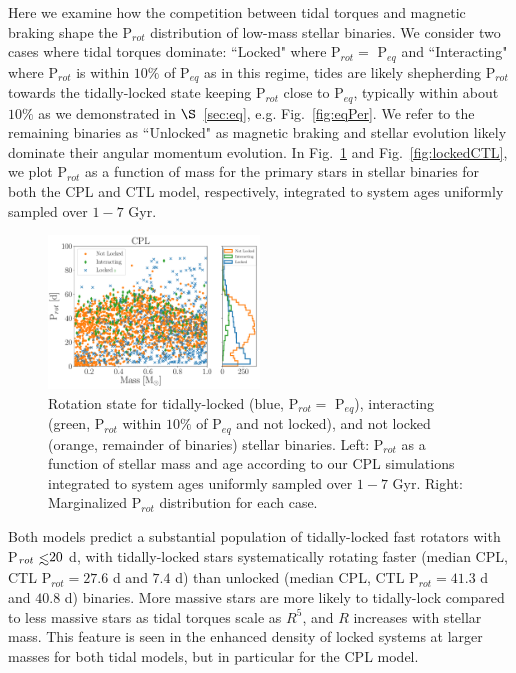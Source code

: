 \documentclass[twocolumn]{aastex61}
\def\lsim{~\rlap{$<$}{\lower 1.0ex\hbox{$\sim$}}}
\begin{document}
Here we examine how the competition between tidal torques and magnetic braking shape the P$_{rot}$ distribution of low-mass stellar binaries.  We consider two cases where tidal torques dominate: ``Locked" where P$_{rot} = $ P$_{eq}$ and ``Interacting" where P$_{rot}$ is within $10\%$ of P$_{eq}$ as in this regime, tides are likely shepherding P$_{rot}$ towards the tidally-locked state keeping P$_{rot}$ close to P$_{eq}$, typically within about $10\%$ as we demonstrated in $\S$~\ref{sec:eq}, e.g. Fig.~\ref{fig:eqPer}. We refer to the remaining binaries as ``Unlocked" as magnetic braking and stellar evolution likely dominate their angular momentum evolution.  In Fig.~\ref{fig:lockedCPL} and Fig.~\ref{fig:lockedCTL}, we plot P$_{rot}$ as a function of mass for the primary stars in stellar binaries for both the CPL and CTL model, respectively, integrated to system ages uniformly sampled over $1-7$ Gyr.  

\begin{figure}
	\includegraphics[width=0.5\textwidth]{../Plots/lockedCPL.pdf}
   \caption{Rotation state for tidally-locked (blue, P$_{rot} = $ P$_{eq}$), interacting (green, P$_{rot}$ within $10\%$ of P$_{eq}$ and not locked), and not locked (orange, remainder of binaries) stellar binaries. Left: P$_{rot}$ as a function of stellar mass and age according to our CPL simulations integrated to system ages uniformly sampled over $1-7$ Gyr. Right: Marginalized P$_{rot}$ distribution for each case.}%
    \label{fig:lockedCPL}%
\end{figure}

Both models predict a substantial population of tidally-locked fast rotators with P$_{rot} \lsim 20$ d, with tidally-locked stars systematically rotating faster (median CPL, CTL P$_{rot} = 27.6$ d and $7.4$ d) than unlocked (median CPL, CTL P$_{rot} = 41.3$ d and $40.8$ d) binaries. More massive stars are more likely to tidally-lock compared to less massive stars as tidal torques scale as $R^5$, and $R$ increases with stellar mass.  This feature is seen in the enhanced density of locked systems at larger masses for both tidal models, but in particular for the CPL model.
\end{document}
